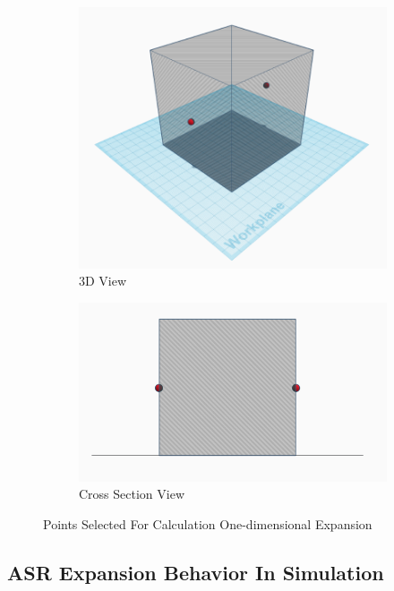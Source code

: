 \begin{figure}[h!]
\centering
\begin{subfigure}{.4\textwidth}
  \centering
  \includegraphics[width=1.0\linewidth]{Files/Method/dis0.png}
\caption{3D View}
\end{subfigure}%
\begin{subfigure}{.4\textwidth}
  \centering
  \includegraphics[width=1.0\linewidth]{Files/Method/dis1.png}
\caption{Cross Section View}
\end{subfigure}%
\caption{Points Selected For Calculation One-dimensional Expansion}
\end{figure}

\subsection{ASR Expansion Behavior In Simulation}

